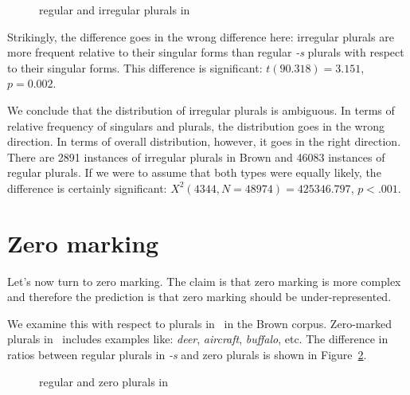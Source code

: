 \documentclass[output=paper,
modfonts
]{LSP/langsci}
\begin{document}
\begin{figure}
\caption{ regular and irregular plurals in \e}
\label{fig:epls}
\begin{knitrout}
\color{fgcolor}
\end{knitrout}
\end{figure}

Strikingly, the difference goes in the wrong difference here: irregular plurals are more frequent relative to their singular forms than regular \emph{-s} plurals with respect to their singular forms. This difference is significant: $t(90.318) = 3.151$, $p =  0.002$.


We conclude that the distribution of irregular plurals is ambiguous. In terms of relative frequency of singulars and plurals, the distribution goes in the wrong direction. In terms of overall distribution, however, it goes in the right direction. There are 2891 instances of irregular plurals in Brown and 46083 instances of regular plurals. If we were to assume that both types were equally likely, the difference is certainly significant: $X^2(4344, N = 48974) = 425346.797$, $p < .001$.

\section{Zero marking}

Let's now turn to zero marking. The claim is that zero marking is more complex and therefore the prediction is that zero marking should be under-represented.

We examine this with respect to plurals in \e\ in the Brown corpus. Zero-marked plurals in \e\ includes examples like: \emph{deer}, \emph{aircraft}, \emph{buffalo}, etc. The difference in ratios between regular plurals in \emph{-s} and zero plurals is shown in Figure~\ref{fig:ezero}.

\begin{figure}
\caption{ regular and zero plurals in \e}
\label{fig:ezero}
\begin{knitrout}
\color{fgcolor}
\end{knitrout}
\end{figure}
\end{document}
